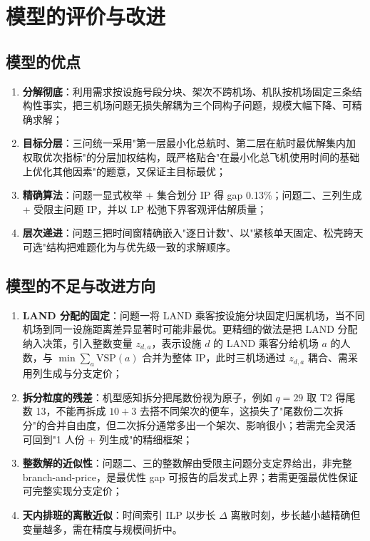 \documentclass[zihao=-4,a4paper]{ctexart}
\begin{document}
\section{模型的评价与改进}

\subsection{模型的优点}

\begin{enumerate}[itemsep=2pt]
  \item \textbf{分解彻底}：利用需求按设施号段分块、架次不跨机场、机队按机场固定三条结构性事实，把三机场问题无损失解耦为三个同构子问题，规模大幅下降、可精确求解；
  \item \textbf{目标分层}：三问统一采用"第一层最小化总航时、第二层在航时最优解集内加权取优次指标"的分层加权结构，既严格贴合"在最小化总飞机使用时间的基础上优化其他因素"的题意，又保证主目标最优；
  \item \textbf{精确算法}：问题一显式枚举 + 集合划分 IP 得 gap 0.13\%；问题二、三列生成 + 受限主问题 IP，并以 LP 松弛下界客观评估解质量；
  \item \textbf{层次递进}：问题三把时间窗精确嵌入"逐日计数"、以"紧核单天固定、松壳跨天可选"结构把难题化为与优先级一致的求解顺序。
\end{enumerate}

\subsection{模型的不足与改进方向}

\begin{enumerate}[itemsep=2pt]
  \item \textbf{LAND 分配的固定}：问题一将 LAND 乘客按设施分块固定归属机场，当不同机场到同一设施距离差异显著时可能非最优。更精细的做法是把 LAND 分配纳入决策，引入整数变量 $z_{d,a}$，表示设施 $d$ 的 LAND 乘客分给机场 $a$ 的人数，与 $\min\sum_a\mathrm{VSP}(a)$ 合并为整体 IP，此时三机场通过 $z_{d,a}$ 耦合、需采用列生成与分支定价；
  \item \textbf{拆分粒度的残差}：机型感知拆分把尾数份视为原子，例如 $q=29$ 取 T2 得尾数 13，不能再拆成 $10+3$ 去搭不同架次的便车，这损失了"尾数份二次拆分"的合并自由度，但二次拆分通常多出一个架次、影响很小；若需完全灵活可回到"1 人份 + 列生成"的精细框架；
  \item \textbf{整数解的近似性}：问题二、三的整数解由受限主问题分支定界给出，非完整 branch-and-price，是最优性 gap 可报告的启发式上界；若需更强最优性保证可完整实现分支定价；
  \item \textbf{天内排班的离散近似}：时间索引 ILP 以步长 $\Delta$ 离散时刻，步长越小越精确但变量越多，需在精度与规模间折中。
\end{enumerate}
\end{document}
